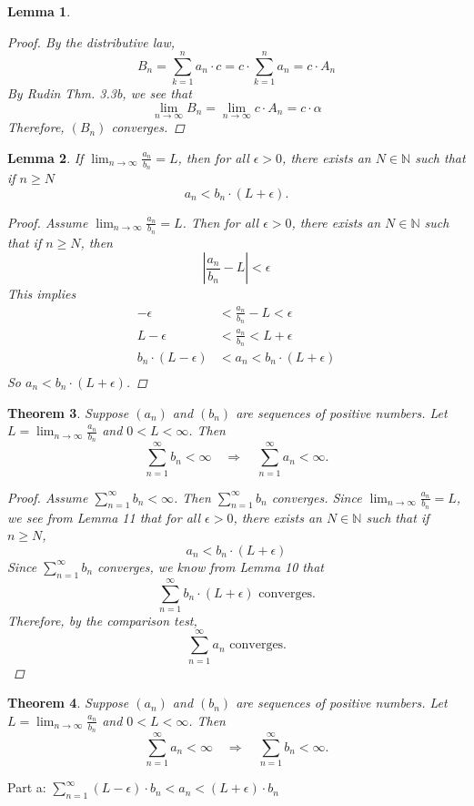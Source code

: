 \documentclass{amsart}
\newtheorem{theorem}{Theorem}
\newtheorem{lemma}[theorem]{Lemma}
\begin{document}
\begin{enumerate}[1.]
\begin{lemma}
\begin{proof}
        By the distributive law,
        \[
            B_n = \sum_{k=1}^n a_n\cdot c = c\cdot\sum_{k=1}^n a_n = c\cdot A_n
        \]
        By Rudin Thm. 3.3b, we see that 
        \[
            \lim_{n\to\infty} B_n = \lim_{n\to\infty} c\cdot A_n = c\cdot\alpha    
        \]
        Therefore, $(B_n)$ converges.
    \end{proof}
\end{lemma}
\begin{lemma}
    If $\displaystyle \lim_{n \to \infty} \frac{a_n}{b_n} = L$, then for all $\epsilon > 0$, there exists an $N\in\mathbb{N}$
    such that if $n \geq N$
    \[
        a_n < b_n\cdot(L + \epsilon). 
    \]
    \begin{proof}
        Assume $\displaystyle \lim_{n \to \infty} \frac{a_n}{b_n} = L$. Then for all $\epsilon > 0$, there exists an $N \in \mathbb{N}$
        such that if $n \geq N$, then
        \[
            \left| \frac{a_n}{b_n} - L \right| < \epsilon    
        \]
        This implies
        \begin{align*}
            -\epsilon &< \frac{a_n}{b_n} - L < \epsilon \\
            L - \epsilon &< \frac{a_n}{b_n} < L + \epsilon \\
            b_n \cdot (L - \epsilon) &< a_n < b_n \cdot (L + \epsilon) \\
        \end{align*}
        So $a_n < b_n \cdot (L + \epsilon)$.
    \end{proof}
\end{lemma}
\begin{theorem}
    Suppose $(a_n)$ and $(b_n)$ are sequences of positive numbers. Let $\displaystyle L= \lim_{n\to\infty}\frac{a_n}{b_n}$ and $0 < L < \infty$.
    Then 
    \[ \sum_{n=1}^{\infty} b_n < \infty \quad \Rightarrow \quad \sum_{n=1}^{\infty} a_n < \infty.\]
    \begin{proof}
        Assume $\displaystyle \sum_{n=1}^{\infty} b_n < \infty$. Then $\displaystyle \sum_{n=1}^{\infty} b_n$ converges.
        Since $\displaystyle \lim_{n \to \infty} \frac{a_n}{b_n} = L$, we see from Lemma 11 that for all $\epsilon > 0$, there
        exists an $N\in\mathbb{N}$ such that if $n \geq N$,
        \[
            a_n < b_n \cdot (L + \epsilon)    
        \]
        Since $\displaystyle \sum_{n=1}^{\infty} b_n$ converges, we know from Lemma 10 that
        \[
            \displaystyle \sum_{n=1}^{\infty} b_n \cdot (L + \epsilon) \text{ converges.}
        \]
        Therefore, by the comparison test,
        \[
            \displaystyle \sum_{n=1}^{\infty} a_n \text{ converges.}
        \]
    \end{proof}
\end{theorem}
\begin{theorem}
    Suppose $(a_n)$ and $(b_n)$ are sequences of positive numbers. Let $\displaystyle L= \lim_{n\to\infty}\frac{a_n}{b_n}$ and $0 < L < \infty$.
    Then 
    \[ \sum_{n=1}^{\infty} a_n < \infty \quad \Rightarrow \quad \sum_{n=1}^{\infty} b_n < \infty.\]
\end{theorem}
Part a: $\sum_{n=1}^{\infty} (L - \epsilon)\cdot b_n < a_n < (L + \epsilon)\cdot b_n$


\end{enumerate}
\end{document}
